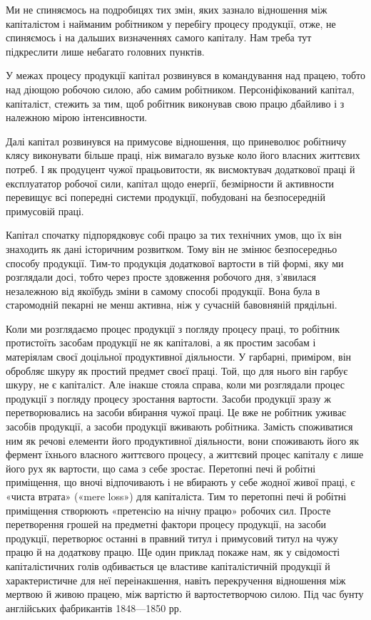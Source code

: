 Ми не спиняємось на подробицях тих змін, яких зазнало відношення
між капіталістом і найманим робітником у перебігу
процесу продукції, отже, не спиняємось і на дальших визначеннях
самого капіталу. Нам треба тут підкреслити лише небагато головних
пунктів.

У межах процесу продукції капітал розвинувся в командування
над працею, тобто над діющою робочою силою, або самим робітником.
Персоніфікований капітал, капіталіст, стежить за тим, щоб
робітник виконував свою працю дбайливо і з належною мірою
інтенсивности.

Далі капітал розвинувся на примусове відношення, що приневолює
робітничу клясу виконувати більше праці, ніж вимагало
вузьке коло його власних життєвих потреб. І як продуцент чужої
працьовитости, як висмоктувач додаткової праці й експлуататор
робочої сили, капітал щодо енерґії, безмірности й активности
перевищує всі попередні системи продукції, побудовані на безпосередній
примусовій праці.

Капітал спочатку підпорядковує собі працю за тих технічних
умов, що їх він знаходить як дані історичним розвитком. Тому він
не змінює безпосередньо способу продукції. Тим-то продукція
додаткової вартости в тій формі, яку ми розглядали досі, тобто
через просте здовження робочого дня, з’явилася незалежною від
якоїбудь зміни в самому способі продукції. Вона була в старомодній
пекарні не менш активна, ніж у сучасній бавовняній прядільні.

Коли ми розглядаємо процес продукції з погляду процесу
праці, то робітник протистоїть засобам продукції не як капіталові,
а як простим засобам і матеріялам своєї доцільної продуктивної
діяльности. У гарбарні, приміром, він обробляє шкуру як простий
предмет своєї праці. Той, що для нього він гарбує шкуру, не є
капіталіст. Але інакше стояла справа, коли ми розглядали процес
продукції з погляду процесу зростання вартости. Засоби продукції
зразу ж перетворювались на засоби вбирання чужої праці. Це
вже не робітник уживає засобів продукції, а засоби продукції
вживають робітника. Замість споживатися ним як речові елементи
його продуктивної діяльности, вони споживають його як
фермент їхнього власного життєвого процесу, а життєвий процес
капіталу є лише його рух як вартости, що сама з себе зростає.
Перетопні печі й робітні приміщення, що вночі відпочивають
і не вбирають у себе жодної живої праці, є «чиста втрата» («mere
loss») для капіталіста. Тим то перетопні печі й робітні приміщення
створюють «претенсію на нічну працю» робочих сил. Просте
перетворення грошей на предметні фактори процесу продукції,
на засоби продукції, перетворює останні в правний титул і примусовий
титул на чужу працю й на додаткову працю. Ще один
приклад покаже нам, як у свідомості капіталістичних голів одбивається
це властиве капіталістичній продукції й характеристичне
для неї переінакшення, навіть перекручення відношення між
мертвою й живою працею, між вартістю й вартостетворчою
силою. Під час бунту англійських фабрикантів 1848—1850 рр.

